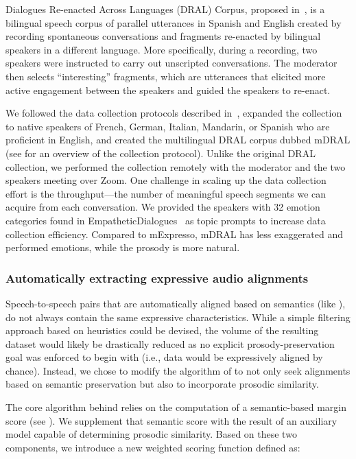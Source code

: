 Dialogues Re-enacted Across Languages (DRAL) Corpus, proposed in~\citet{ward2023dral}, is a bilingual speech corpus of parallel utterances in Spanish and English created by recording spontaneous conversations and fragments re-enacted by bilingual speakers in a different language.
More specifically, during a recording, two speakers were instructed to carry out unscripted conversations. The moderator then selects ``interesting'' fragments, which are utterances that elicited more active engagement between the speakers and guided the speakers to re-enact.

We followed the data collection protocols described in~\citet{ward2023dral}, expanded the collection to native speakers of French, German, Italian, Mandarin, or Spanish who are proficient in English, and created the multilingual DRAL corpus dubbed mDRAL (see  for an overview of the collection protocol).
Unlike the original DRAL collection, we performed the collection remotely with the moderator and the two speakers meeting over Zoom. One challenge in scaling up the data collection effort is the throughput—the number of meaningful speech segments we can acquire from each conversation. We provided the speakers with 32 emotion categories found in EmpatheticDialogues~\citep{rashkin2019towards} as topic prompts to increase data collection efficiency. Compared to mExpresso, mDRAL has less exaggerated and performed emotions, while the prosody is more natural.



\subsubsection{Automatically extracting expressive audio alignments}
\label{subsec:exp_audio_alignment}


Speech-to-speech pairs that are automatically aligned based on semantics (like \seamlessalign), %
do not always contain the same expressive characteristics. 
While a simple filtering approach %
based on heuristics could be devised, the volume of the resulting dataset would likely be drastically reduced as no explicit prosody-preservation goal was enforced to begin with (i.e., data would be expressively aligned by chance). Instead, we chose to modify the algorithm of \seamlessalign to not only seek alignments based on semantic preservation but also to incorporate prosodic similarity.

The core algorithm behind \seamlessalign relies on the computation of a semantic-based margin score (see ). We supplement that semantic score with the result of an auxiliary model capable of determining prosodic similarity. 
Based on these two components, we introduce a new weighted scoring function defined as:

